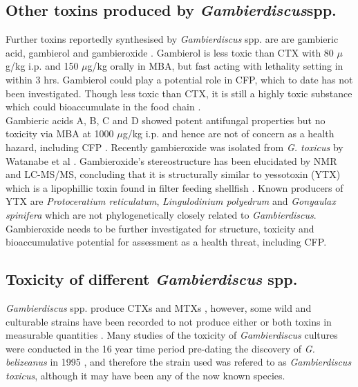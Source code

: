 \documentclass[12pt]{article}
\begin{document}
\subsection{Other toxins produced by \emph{Gambierdiscus}spp.}
Further toxins reportedly synthesised by \emph{Gambierdiscus} spp. are are gambieric acid, gambierol and gambieroxide \cite{watanabe2013gambieroxide,satake1993gambierol,nagai1992gambieric}.
Gambierol is less toxic than CTX with 80 $\mu$g/kg i.p. and 150 $\mu$g/kg orally in MBA, but fast acting with lethality setting in within 3 hrs\cite{ito2003pathological}. Gambierol could play a potential role in CFP, which to date has not been investigated. Though less toxic than CTX, it is still a highly toxic substance which could bioaccumulate in the food chain \cite{rhodes2014production}.\\
Gambieric acids A, B, C and D showed potent antifungal properties but no toxicity via MBA at 1000 $\mu$g/kg i.p. and hence are not of concern as a health hazard, including CFP \cite{rhodes2014production,nagai1992gambieric}.
Recently gambieroxide was isolated from \emph{G. toxicus} by Watanabe et al \cite{watanabe2013gambieroxide}. Gambieroxide's stereostructure has been elucidated by NMR and LC-MS/MS, concluding that it is structurally similar to yessotoxin (YTX) which is a lipophillic toxin found in filter feeding shellfish  \cite{tubaro2010yessotoxins}. Known producers of YTX are \emph{Protoceratium reticulatum}, \emph{Lingulodinium polyedrum} and \emph{Gonyaulax spinifera} \cite{tubaro2010yessotoxins} which are not  phylogenetically closely related to \emph{Gambierdiscus}.  Gambieroxide needs to be further investigated for structure, toxicity and bioaccumulative potential for assessment as a health threat, including CFP. \\

\subsection{Toxicity of different \emph{Gambierdiscus} spp.}
\emph{Gambierdiscus} spp. produce CTXs and MTXs \cite{murata1990structures,holmes1991strain,satake1993structure,holmes1994purification,satake1996isolation}, however, some wild and culturable strains have been recorded to not produce either or both toxins in measurable quantities \cite{gillespie1985significance,holmes1990toxicity}. Many studies of the toxicity of \emph{Gambierdiscus} cultures were conducted in the 16 year time period pre-dating the discovery of \emph{G. belizeanus} in 1995 \cite{faust1995observation}, and therefore the strain used was refered to as \emph{Gambierdiscus toxicus}, although it may have been any of the now known species. \\
\end{document}
